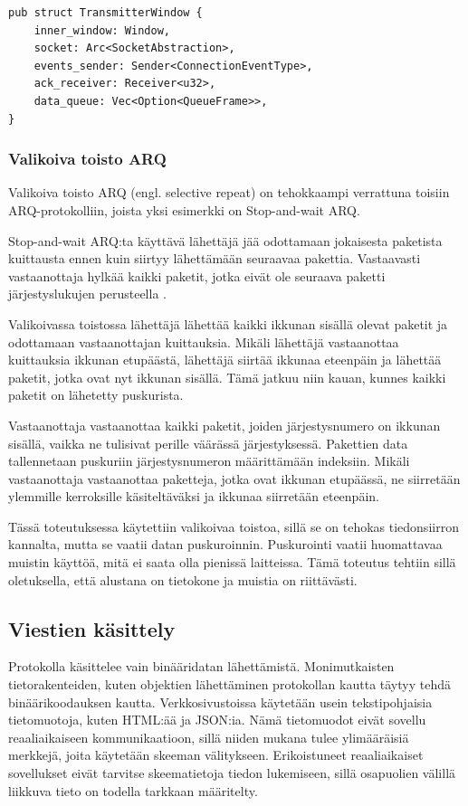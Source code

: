 \documentclass[a4paper,12pt]{article}
\begin{document}
    \begin{lstlisting}[caption={Lähettävän ikkunan rakenne}, label={lst:twindow}]
pub struct TransmitterWindow {
    inner_window: Window,
    socket: Arc<SocketAbstraction>,
    events_sender: Sender<ConnectionEventType>,
    ack_receiver: Receiver<u32>,
    data_queue: Vec<Option<QueueFrame>>,
}\end{lstlisting}

    \subsubsection*{Valikoiva toisto ARQ}\label{subsec:valikoiva_toisto}
    Valikoiva toisto ARQ (engl. selective repeat) on tehokkaampi verrattuna toisiin ARQ-protokolliin, joista yksi esimerkki on Stop-and-wait ARQ.

    Stop-and-wait ARQ:ta käyttävä lähettäjä jää odottamaan jokaisesta paketista kuittausta ennen kuin siirtyy lähettämään seuraavaa pakettia. Vastaavasti vastaanottaja hylkää kaikki paketit, jotka eivät ole seuraava paketti järjestyslukujen perusteella \cite{StopAndWaitARQ}.

    Valikoivassa toistossa lähettäjä lähettää kaikki ikkunan sisällä olevat paketit ja odottamaan vastaanottajan kuittauksia. Mikäli lähettäjä vastaanottaa kuittauksia ikkunan etupäästä, lähettäjä siirtää ikkunaa eteenpäin ja lähettää paketit, jotka ovat nyt ikkunan sisällä. Tämä jatkuu niin kauan, kunnes kaikki paketit on lähetetty puskurista. \par

    Vastaanottaja vastaanottaa kaikki paketit, joiden järjestysnumero on ikkunan sisällä, vaikka ne tulisivat perille väärässä järjestyksessä. Pakettien data tallennetaan puskuriin järjestysnumeron määrittämään indeksiin. Mikäli vastaanottaja vastaanottaa paketteja, jotka ovat ikkunan etupäässä, ne siirretään ylemmille kerroksille käsiteltäväksi ja ikkunaa siirretään eteenpäin.

    Tässä toteutuksessa käytettiin valikoivaa toistoa, sillä se on tehokas tiedonsiirron kannalta, mutta se vaatii datan puskuroinnin. Puskurointi vaatii huomattavaa muistin käyttöä, mitä ei saata olla pienissä laitteissa. Tämä toteutus tehtiin sillä oletuksella, että alustana on tietokone ja muistia on riittävästi.\par

    \subsection{Viestien käsittely}
    Protokolla käsittelee vain binääridatan lähettämistä. Monimutkaisten tietorakenteiden, kuten objektien lähettäminen protokollan kautta täytyy tehdä binäärikoodauksen kautta. Verkkosivustoissa käytetään usein tekstipohjaisia tietomuotoja, kuten HTML:ää ja JSON:ia. Nämä tietomuodot eivät sovellu reaaliaikaiseen kommunikaatioon, sillä niiden mukana tulee ylimääräisiä merkkejä, joita käytetään skeeman välitykseen. Erikoistuneet reaaliaikaiset sovellukset eivät tarvitse skeematietoja tiedon lukemiseen, sillä osapuolien välillä liikkuva tieto on todella tarkkaan määritelty.
    \par
\end{document}
